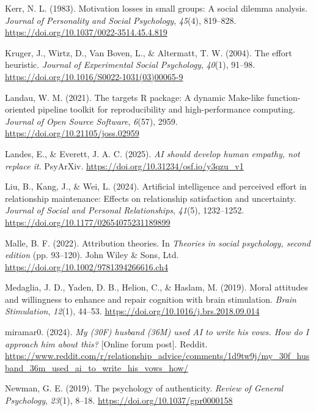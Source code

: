 \documentclass[
  man,
  floatsintext,
  longtable,
  nolmodern,
  notxfonts,
  notimes,
  colorlinks=true,linkcolor=blue,citecolor=blue,urlcolor=blue]{apa7}
\newlength{\cslhangindent}
\newenvironment{CSLReferences}[2] %
 {\begin{list}{}{%
  \setlength{\itemindent}{0pt}
  \setlength{\leftmargin}{0pt}
  \setlength{\parsep}{0pt}
  \ifodd #1
   \setlength{\leftmargin}{\cslhangindent}
   \setlength{\itemindent}{-1\cslhangindent}
  \fi
  \setlength{\itemsep}{#2\baselineskip}}}
 {\end{list}}
\begin{document}
\begin{CSLReferences}{1}{0}
Kerr, N. L. (1983). Motivation losses in small groups: A social dilemma
analysis. \emph{Journal of Personality and Social Psychology},
\emph{45}(4), 819--828. \url{https://doi.org/10.1037/0022-3514.45.4.819}

Kruger, J., Wirtz, D., Van Boven, L., \& Altermatt, T. W. (2004). The
effort heuristic. \emph{Journal of Experimental Social Psychology},
\emph{40}(1), 91--98.
\url{https://doi.org/10.1016/S0022-1031(03)00065-9}

Landau, W. M. (2021). The targets {R} package: A dynamic {M}ake-like
function-oriented pipeline toolkit for reproducibility and
high-performance computing. \emph{Journal of Open Source Software},
\emph{6}(57), 2959. \url{https://doi.org/10.21105/joss.02959}

Landes, E., \& Everett, J. A. C. (2025). \emph{AI should develop human
empathy, not replace it}. PsyArXiv.
\url{https://doi.org/10.31234/osf.io/y3qzu_v1}

Liu, B., Kang, J., \& Wei, L. (2024). Artificial intelligence and
perceived effort in relationship maintenance: Effects on relationship
satisfaction and uncertainty. \emph{Journal of Social and Personal
Relationships}, \emph{41}(5), 1232--1252.
\url{https://doi.org/10.1177/02654075231189899}

Malle, B. F. (2022). Attribution theories. In \emph{Theories in social
psychology, second edition} (pp. 93--120). John Wiley \& Sons, Ltd.
\url{https://doi.org/10.1002/9781394266616.ch4}

Medaglia, J. D., Yaden, D. B., Helion, C., \& Haslam, M. (2019). Moral
attitudes and willingness to enhance and repair cognition with brain
stimulation. \emph{Brain Stimulation}, \emph{12}(1), 44--53.
\url{https://doi.org/10.1016/j.brs.2018.09.014}

miramar0. (2024). \emph{My (30F) husband (36M) used {AI} to write his
vows. How do {I} approach him about this?} {[}Online forum post{]}.
Reddit.
\url{https://www.reddit.com/r/relationship_advice/comments/1d9tw9j/my_30f_husband_36m_used_ai_to_write_his_vows_how/}

Newman, G. E. (2019). The psychology of authenticity. \emph{Review of
General Psychology}, \emph{23}(1), 8--18.
\url{https://doi.org/10.1037/gpr0000158}


\end{CSLReferences}
\end{document}
